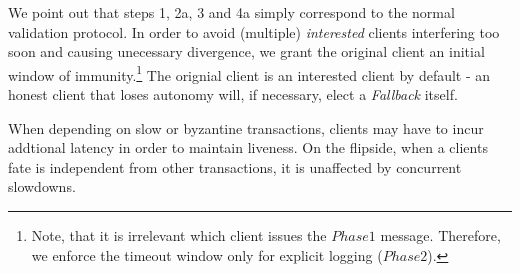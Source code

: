 We point out that steps 1, 2a, 3 and 4a simply correspond to the normal validation protocol. In order to avoid (multiple) \textit{interested} clients interfering too soon and causing unecessary divergence, we grant the original client an initial window of immunity.\footnote{Note, that it is irrelevant which client issues the $Phase1$ message. Therefore, we enforce the timeout window only for explicit logging ($Phase2$).} The orignial client is an interested client by default - an honest client that loses autonomy will, if necessary, elect a \textit{Fallback} itself. 

When depending on slow or byzantine transactions, clients may have to incur addtional latency in order to maintain liveness. On the flipside, when a clients fate is independent from other transactions, it is unaffected by concurrent slowdowns. 
